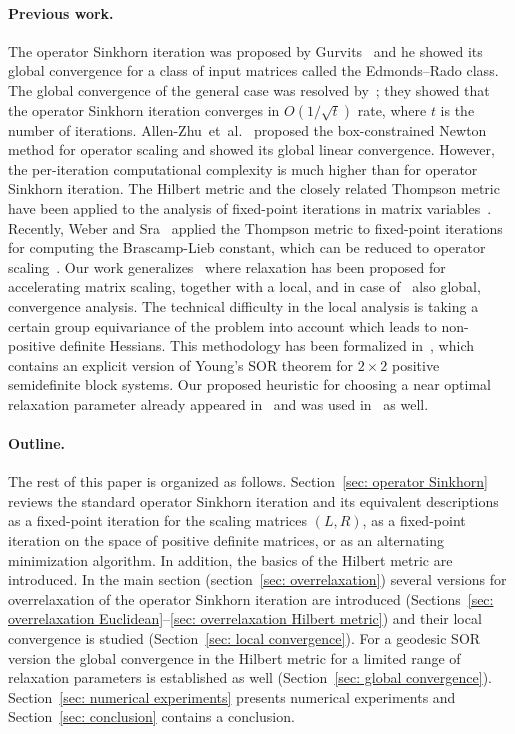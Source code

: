 \documentclass[a4paper]{article}
\theoremstyle{definition}
\numberwithin{equation}{section}
\begin{document}
\paragraph*{Previous work.}
The operator Sinkhorn iteration was proposed by Gurvits~\cite{Gurvits2004} and he showed its global convergence for a class of input matrices called the Edmonds--Rado class. The global convergence of the general case was resolved by~\cite{Garg2019}; they showed that the operator Sinkhorn iteration converges in $O(1/\sqrt{t})$ rate, where $t$ is the number of iterations. Allen-Zhu~et~al.~\cite{Allen-Zhu2018} proposed the box-constrained Newton method for operator scaling and showed its global linear convergence. However, the per-iteration computational complexity is much higher than for operator Sinkhorn iteration. The Hilbert metric and the closely related Thompson metric have been applied to the analysis of fixed-point iterations in matrix variables~\cite{Lemmens2012,Sra2013,Sra2015,Georgiou2015}. Recently, Weber and Sra~\cite{Weber2023} applied the Thompson metric to fixed-point iterations for computing the Brascamp-Lieb constant, which can be reduced to operator scaling~\cite{Garg2018}. Our work generalizes~\cite{Gabriel2019,Thibault2021,Lehmann2022} where relaxation has been proposed for accelerating matrix scaling, together with a local, and in case of~\cite{Lehmann2022} also global, convergence analysis. The technical difficulty in the local analysis is taking a certain group equivariance of the problem into account which leads to non-positive definite Hessians. This methodology has been formalized in~\cite{Oseledets2023}, which contains an explicit version of Young's SOR theorem for $2\times 2$ positive semidefinite block systems. Our proposed heuristic for choosing a near optimal relaxation parameter already appeared in~\cite{Hageman1975} and was used in~\cite{Lehmann2022,Oseledets2023} as well.

\paragraph*{Outline.}
The rest of this paper is organized as follows. Section~\ref{sec: operator Sinkhorn} reviews the standard operator Sinkhorn iteration and its equivalent descriptions as a fixed-point iteration for the scaling matrices $(L,R)$, as a fixed-point iteration on the space of positive definite matrices, or as an alternating minimization algorithm. In addition, the basics of the Hilbert metric are introduced. In the main section (section~\ref{sec: overrelaxation}) several versions for overrelaxation of the operator Sinkhorn iteration are introduced (Sections~\ref{sec: overrelaxation Euclidean}--\ref{sec: overrelaxation Hilbert metric}) and their local convergence is studied (Section~\ref{sec: local convergence}). For a geodesic SOR version the global convergence in the Hilbert metric for a limited range of relaxation parameters is established as well (Section~\ref{sec: global convergence}). Section~\ref{sec: numerical experiments} presents numerical experiments and Section~\ref{sec: conclusion} contains a conclusion.
\end{document}

